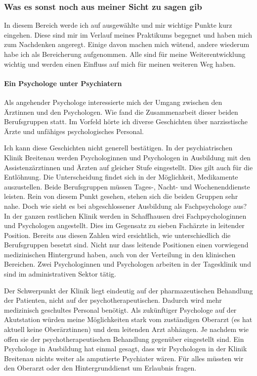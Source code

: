 \subsubsection{Was es sonst noch aus meiner Sicht zu sagen gib} \label{sec:Sonstiges}
In diesem Bereich werde ich auf ausgewählte und mir wichtige Punkte kurz eingehen. Diese sind mir im Verlauf meines Praktikums begegnet und haben mich zum Nachdenken angeregt. Einige davon machen mich wütend, andere wiederum habe ich als Bereicherung aufgenommen. Alle sind für meine Weiterentwicklung wichtig und werden einen Einfluss auf mich für meinen weiteren Weg haben.

\paragraph{Ein Psychologe unter Psychiatern}
Als angehender Psychologe interessierte mich der Umgang zwischen den Ärztinnen und den Psychologen. Wie fand die Zusammenarbeit dieser beiden Berufsgruppen statt. Im Vorfeld hörte ich diverse Geschichten über narzisstische Ärzte und unfähiges psychologisches Personal. 

Ich kann diese Geschichten nicht generell bestätigen. In der psychiatrischen Klinik Breitenau werden Psychologinnen und Psychologen in Ausbildung mit den Assistenzärztinnen und Ärzten auf gleicher Stufe eingestellt. Dies gilt auch für die Entlöhnung. Die Unterscheidung findet sich in der Möglichkeit,  Medikamente auszustellen. Beide Berufsgruppen müssen Tages-, Nacht- und Wochenenddienste leisten. Rein von diesem Punkt gesehen, stehen sich die beiden Gruppen sehr nahe. Doch wie sieht es bei abgeschlossener Ausbildung als Fachpsychologe aus? In der ganzen restlichen Klinik werden in Schaffhausen drei Fachpsychologinnen und Psychologen angestellt. Dies im Gegensatz zu sieben Fachärzte in leitender Position. Bereits aus diesen Zahlen wird ersichtlich, wie unterschiedlich die Berufsgruppen besetzt sind. Nicht nur dass leitende Positionen einen vorwiegend medizinischen Hintergrund haben, auch von der Verteilung in den klinischen Bereichen. Zwei Psychologinnen und Psychologen arbeiten in der Tagesklinik und sind im administrativen Sektor tätig. 

Der Schwerpunkt der Klinik liegt eindeutig auf der pharmazeutischen Behandlung der Patienten, nicht auf der psychotherapeutischen. Dadurch wird mehr medizinisch geschultes Personal benötigt. Als zukünftiger Psychologe auf der Akutstation würden meine Möglichkeiten stark vom zuständigen Oberarzt (es hat aktuell keine Oberärztinnen) und dem leitenden Arzt abhängen. Je nachdem wie offen sie der psychotherapeutischen Behandlung gegenüber eingestellt sind. Ein Psychologe in Ausbildung hat einmal gesagt, dass wir Psychologen in der Klinik Breitenau nichts weiter als amputierte Psychiater wären. Für alles müssten wir den Oberarzt oder den Hintergrunddienst um Erlaubnis fragen. 

